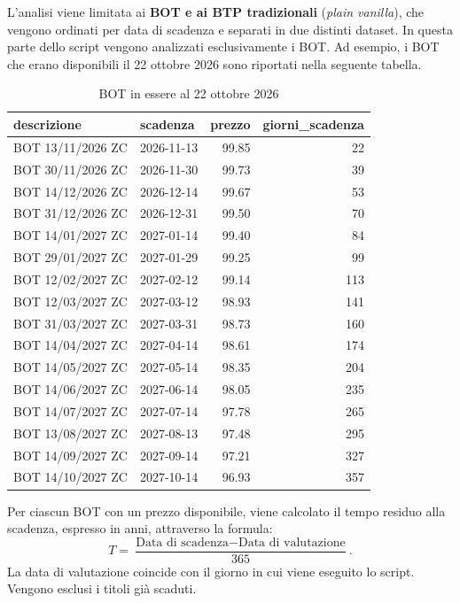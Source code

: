L'analisi viene limitata ai \textbf{BOT e ai BTP tradizionali} (\textit{plain vanilla}), che vengono ordinati per data di scadenza e separati in due distinti dataset. In questa parte dello script vengono analizzati esclusivamente i BOT. Ad esempio, i BOT che erano disponibili il 22 ottobre 2026 sono riportati nella seguente tabella.

\begin{table}
\begin{tabular}{llrr}
\toprule
descrizione & scadenza & prezzo & giorni\_scadenza\\
\midrule
BOT 13/11/2026 ZC & 2026-11-13 & 99.85 & 22\\
BOT 30/11/2026 ZC & 2026-11-30 & 99.73 & 39\\
BOT 14/12/2026 ZC & 2026-12-14 & 99.67 & 53\\
BOT 31/12/2026 ZC & 2026-12-31 & 99.50 & 70\\
BOT 14/01/2027 ZC & 2027-01-14 & 99.40 & 84\\
\addlinespace
BOT 29/01/2027 ZC & 2027-01-29 & 99.25 & 99\\
BOT 12/02/2027 ZC & 2027-02-12 & 99.14 & 113\\
BOT 12/03/2027 ZC & 2027-03-12 & 98.93 & 141\\
BOT 31/03/2027 ZC & 2027-03-31 & 98.73 & 160\\
BOT 14/04/2027 ZC & 2027-04-14 & 98.61 & 174\\
\addlinespace
BOT 14/05/2027 ZC & 2027-05-14 & 98.35 & 204\\
BOT 14/06/2027 ZC & 2027-06-14 & 98.05 & 235\\
BOT 14/07/2027 ZC & 2027-07-14 & 97.78 & 265\\
BOT 13/08/2027 ZC & 2027-08-13 & 97.48 & 295\\
BOT 14/09/2027 ZC & 2027-09-14 & 97.21 & 327\\
\addlinespace
BOT 14/10/2027 ZC & 2027-10-14 & 96.93 & 357\\
\bottomrule
\end{tabular}
\caption{BOT in essere al 22 ottobre 2026}
\label{tab:allbot}
\end{table}

Per ciascun BOT con un prezzo disponibile, viene calcolato il tempo residuo alla scadenza, espresso in anni, attraverso la formula:
\[
T=\frac{\text{Data di scadenza}-\text{Data di valutazione}}{365}.
\]
La data di valutazione coincide con il giorno in cui viene eseguito lo script. Vengono esclusi i titoli già scaduti.

